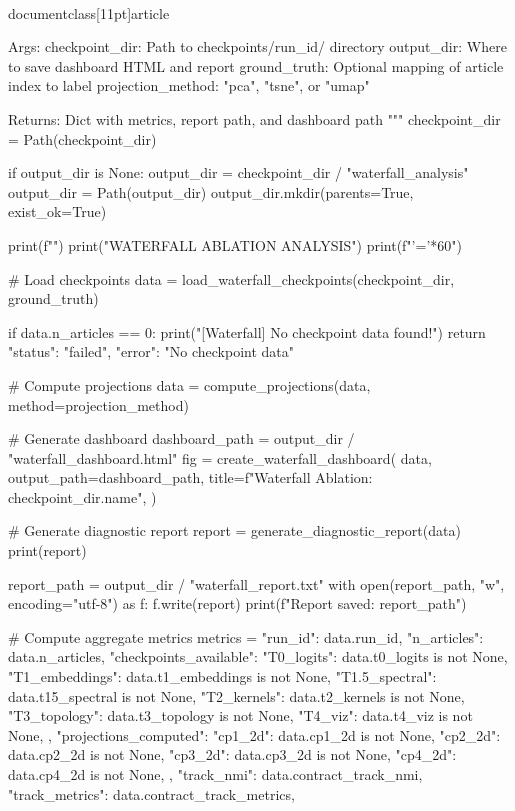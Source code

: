\\documentclass[11pt]{article}
\begin{document}
\begin{CodeBlock}
    Args:
        checkpoint_dir: Path to checkpoints/{run_id}/ directory
        output_dir: Where to save dashboard HTML and report
        ground_truth: Optional mapping of article index to label
        projection_method: "pca", "tsne", or "umap"

    Returns:
        Dict with metrics, report path, and dashboard path
    """
    checkpoint_dir = Path(checkpoint_dir)

    if output_dir is None:
        output_dir = checkpoint_dir / "waterfall_analysis"
    output_dir = Path(output_dir)
    output_dir.mkdir(parents=True, exist_ok=True)

    print(f"")
    print("WATERFALL ABLATION ANALYSIS")
    print(f"{'='*60}")

    # Load checkpoints
    data = load_waterfall_checkpoints(checkpoint_dir, ground_truth)

    if data.n_articles == 0:
        print("[Waterfall] No checkpoint data found!")
        return {"status": "failed", "error": "No checkpoint data"}

    # Compute projections
    data = compute_projections(data, method=projection_method)

    # Generate dashboard
    dashboard_path = output_dir / "waterfall_dashboard.html"
    fig = create_waterfall_dashboard(
        data,
        output_path=dashboard_path,
        title=f"Waterfall Ablation: {checkpoint_dir.name}",
    )

    # Generate diagnostic report
    report = generate_diagnostic_report(data)
    print(report)

    report_path = output_dir / "waterfall_report.txt"
    with open(report_path, "w", encoding="utf-8") as f:
        f.write(report)
    print(f"\n[Waterfall] Report saved: {report_path}")

    # Compute aggregate metrics
    metrics = {
        "run_id": data.run_id,
        "n_articles": data.n_articles,
        "checkpoints_available": {
            "T0_logits": data.t0_logits is not None,
            "T1_embeddings": data.t1_embeddings is not None,
            "T1.5_spectral": data.t15_spectral is not None,
            "T2_kernels": data.t2_kernels is not None,
            "T3_topology": data.t3_topology is not None,
            "T4_viz": data.t4_viz is not None,
        },
        "projections_computed": {
            "cp1_2d": data.cp1_2d is not None,
            "cp2_2d": data.cp2_2d is not None,
            "cp3_2d": data.cp3_2d is not None,
            "cp4_2d": data.cp4_2d is not None,
        },
        "track_nmi": data.contract_track_nmi,
        "track_metrics": data.contract_track_metrics,
    }


\end{CodeBlock}
\end{document}
